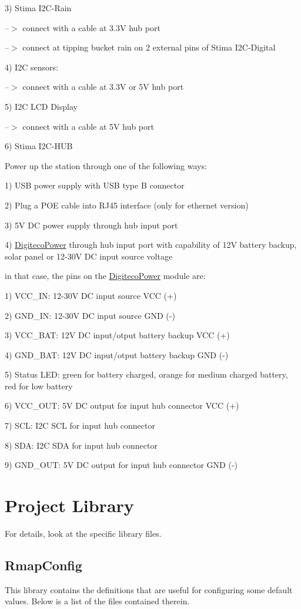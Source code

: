 3) Stima I2\+C-\/\+Rain

--$>$ connect with a cable at 3.\+3V hub port

--$>$ connect at tipping bucket rain on 2 external pins of Stima I2\+C-\/\+Digital

4) I2C sensor\textquotesingle{}s\+:

--$>$ connect with a cable at 3.\+3V or 5V hub port

5) I2C L\+CD Display

--$>$ connect with a cable at 5V hub port

6) Stima I2\+C-\/\+H\+UB

Power up the station through one of the following ways\+:

1) U\+SB power supply with U\+SB type B connector

2) Plug a P\+OE cable into R\+J45 interface (only for ethernet version)

3) 5V DC power supply through hub input port

4) \hyperlink{namespaceDigitecoPower}{Digiteco\+Power} through hub input port with capability of 12V battery backup, solar panel or 12-\/30V DC input source voltage

in that case, the pins on the \hyperlink{namespaceDigitecoPower}{Digiteco\+Power} module are\+:

1) V\+C\+C\+\_\+\+IN\+: 12-\/30V DC input source V\+CC (+)

2) G\+N\+D\+\_\+\+IN\+: 12-\/30V DC input source G\+ND (-\/)

3) V\+C\+C\+\_\+\+B\+AT\+: 12V DC input/otput battery backup V\+CC (+)

4) G\+N\+D\+\_\+\+B\+AT\+: 12V DC input/otput battery backup G\+ND (-\/)

5) Status L\+ED\+: green for battery charged, orange for medium charged battery, red for low battery

6) V\+C\+C\+\_\+\+O\+UT\+: 5V DC output for input hub connector V\+CC (+)

7) S\+CL\+: I2C S\+CL for input hub connector

8) S\+DA\+: I2C S\+DA for input hub connector

9) G\+N\+D\+\_\+\+O\+UT\+: 5V DC output for input hub connector G\+ND (-\/)\hypertarget{index_library}{}\section{Project Library}\label{index_library}
For details, look at the specific library files.\hypertarget{index_rmapconfig}{}\subsection{Rmap\+Config}\label{index_rmapconfig}
This library contains the definitions that are useful for configuring some default values. Below is a list of the files contained therein.

